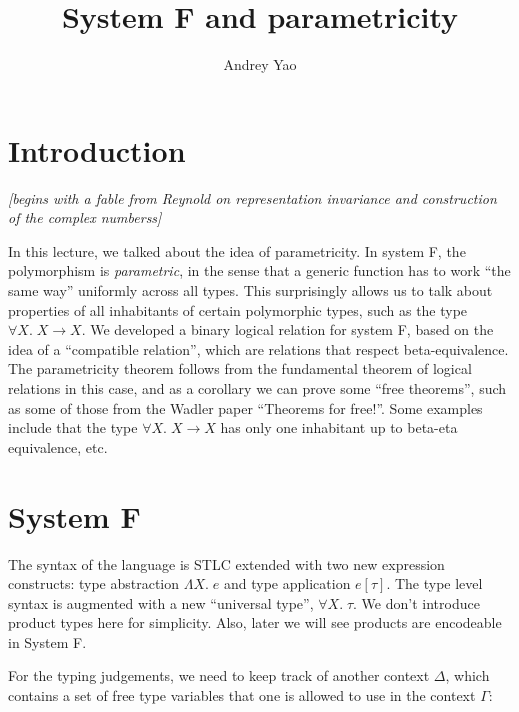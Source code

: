 \documentclass{notes}
\title{System F and parametricity}
\author{Andrey Yao}
\newcommand{\unit}{()}
\newcommand{\Unit}{\texttt{unit}}
\begin{document}
\maketitle

\section{Introduction}

\textit{[begins with a fable from Reynold on representation invariance and construction of the complex numberss]}

In this lecture, we talked about the idea of parametricity. In system F, the polymorphism is \textit{parametric}, in the sense that a generic function has to work ``the same way'' uniformly across all types. This surprisingly allows us to talk about properties of all inhabitants of certain polymorphic types, such as the type $\forall X.\;X\to X$. We developed a binary logical relation for system F, based on the idea of a ``compatible relation'', which are relations that respect beta-equivalence. The parametricity theorem follows from the fundamental theorem of logical relations in this case, and as a corollary we can prove some ``free theorems'', such as some of those from the Wadler paper ``Theorems for free!''. Some examples include that the type $\forall X.\;X\to X$ has only one inhabitant up to beta-eta equivalence, etc.

\section{System F}

The syntax of the language is STLC extended with two new expression constructs: type abstraction $\Lambda X.\;e$ and type application $e[\tau]$. The type level syntax is augmented with a new ``universal type'', $\forall X.\;\tau$. We don't introduce product types here for simplicity. Also, later we will see products are encodeable in System F.
%
\begin{syntax}
  \category[Types]{\tau}
  \alternative{\Unit}

  \alternative{\unit}
\end{syntax}
%

For the typing judgements, we need to keep track of another context $\Delta$, which contains a set of free type variables that one is allowed to use in the context $\Gamma$:
\end{document}

